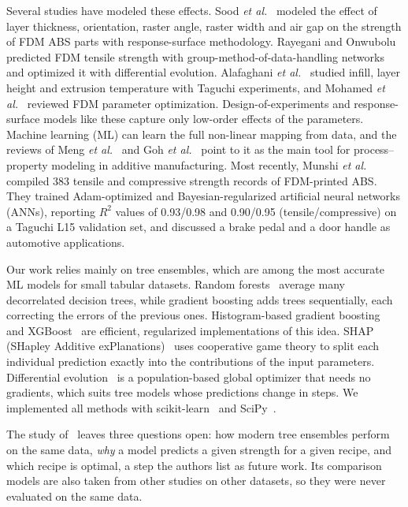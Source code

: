 \documentclass[conference,12pt]{IEEEtran}
\begin{document}
Several studies have modeled these effects. Sood \textit{et al.}~\cite{sood2010} modeled the effect of layer thickness, orientation, raster angle, raster width and air gap on the strength of FDM ABS parts with response-surface methodology. Rayegani and Onwubolu~\cite{rayegani2014} predicted FDM tensile strength with group-method-of-data-handling networks and optimized it with differential evolution. Alafaghani \textit{et al.}~\cite{alafaghani2017} studied infill, layer height and extrusion temperature with Taguchi experiments, and Mohamed \textit{et al.}~\cite{mohamed2015} reviewed FDM parameter optimization. Design-of-experiments and response-surface models like these capture only low-order effects of the parameters. Machine learning (ML) can learn the full non-linear mapping from data, and the reviews of Meng \textit{et al.}~\cite{meng2020} and Goh \textit{et al.}~\cite{goh2021} point to it as the main tool for process--property modeling in additive manufacturing. Most recently, Munshi \textit{et al.}~\cite{munshi2026} compiled 383 tensile and compressive strength records of FDM-printed ABS. They trained Adam-optimized and Bayesian-regularized artificial neural networks (ANNs), reporting $R^2$ values of 0.93/0.98 and 0.90/0.95 (tensile/compressive) on a Taguchi L15 validation set, and discussed a brake pedal and a door handle as automotive applications.

Our work relies mainly on tree ensembles, which are among the most accurate ML models for small tabular datasets. Random forests~\cite{breiman2001} average many decorrelated decision trees, while gradient boosting adds trees sequentially, each correcting the errors of the previous ones. Histogram-based gradient boosting~\cite{ke2017} and XGBoost~\cite{chen2016} are efficient, regularized implementations of this idea. SHAP (SHapley Additive exPlanations)~\cite{lundberg2017} uses cooperative game theory to split each individual prediction exactly into the contributions of the input parameters. Differential evolution~\cite{storn1997} is a population-based global optimizer that needs no gradients, which suits tree models whose predictions change in steps. We implemented all methods with scikit-learn~\cite{pedregosa2011} and SciPy~\cite{virtanen2020}.

The study of~\cite{munshi2026} leaves three questions open: how modern tree ensembles perform on the same data, \emph{why} a model predicts a given strength for a given recipe, and which recipe is optimal, a step the authors list as future work. Its comparison models are also taken from other studies on other datasets, so they were never evaluated on the same data.
\end{document}
